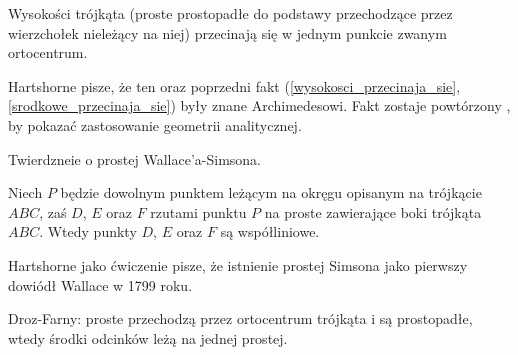 \begin{proposition}
	\label{wysokosci_przecinaja_sie}
	Wysokości trójkąta (proste prostopadłe do podstawy przechodzące przez wierzchołek nieleżący na niej) przecinają się w jednym punkcie zwanym ortocentrum.
\end{proposition}

Hartshorne \cite[s. 52, 54]{hartshorne2000} pisze, że ten oraz poprzedni fakt (\ref{wysokosci_przecinaja_sie}, \ref{srodkowe_przecinaja_sie}) były znane Archimedesowi.
Fakt zostaje powtórzony \cite[s. 119-120]{hartshorne2000}, by pokazać zastosowanie geometrii analitycznej.

Twierdzneie o prostej Wallace'a-Simsona. %


\begin{proposition}
	Niech $P$ będzie dowolnym punktem leżącym na okręgu opisanym na trójkącie $ABC$, zaś $D$, $E$ oraz $F$ rzutami punktu $P$ na proste zawierające boki trójkąta $ABC$.
	Wtedy punkty $D$, $E$ oraz $F$ są współliniowe.
\end{proposition}

Hartshorne jako ćwiczenie \cite[s. 61]{hartshorne2000} pisze, że istnienie prostej Simsona jako pierwszy dowiódł Wallace w 1799 roku.


Droz-Farny: proste przechodzą przez ortocentrum trójkąta i są prostopadłe, wtedy środki odcinków leżą na jednej prostej. %

%